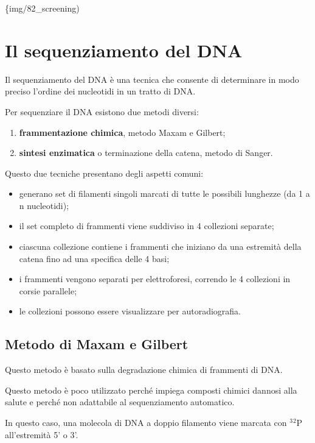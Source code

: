 \documentclass[11pt]{book}
\begin{document}
\{img/82\_screening)

\chapter{Il sequenziamento del
DNA}\label{il-sequenziamento-del-dna}

Il sequenziamento del DNA è una tecnica che consente di determinare in
modo preciso l'ordine dei nucleotidi in un tratto di DNA.

Per sequenziare il DNA esistono due metodi diversi:

\begin{enumerate}
\def\labelenumi{\arabic{enumi}.}
\itemsep1pt\parskip0pt
\item
  \textbf{frammentazione chimica}, metodo Maxam e Gilbert;
\item
  \textbf{sintesi enzimatica} o terminazione della catena, metodo di
  Sanger.
\end{enumerate}

Questo due tecniche presentano degli aspetti comuni:

\begin{itemize}
\itemsep1pt\parskip0pt
\item
  generano set di filamenti singoli marcati di tutte le possibili
  lunghezze (da 1 a n nucleotidi);
\item
  il set completo di frammenti viene suddiviso in 4 collezioni separate;
\item
  ciascuna collezione contiene i frammenti che iniziano da una estremità
  della catena fino ad una specifica delle 4 basi;
\item
  i frammenti vengono separati per elettroforesi, correndo le 4
  collezioni in corsie parallele;
\item
  le collezioni possono essere visualizzare per autoradiografia.
\end{itemize}

\section{Metodo di Maxam e Gilbert}\label{metodo-di-maxam-e-gilbert}

Questo metodo è basato sulla degradazione chimica di frammenti di DNA.

Questo metodo è poco utilizzato perché impiega composti chimici dannosi
alla salute e perché non adattabile al sequenziamento automatico.

In questo caso, una molecola di DNA a doppio filamento viene marcata con
\(^3\)\(^2\)P all'estremità 5' o 3'.
\end{document}
